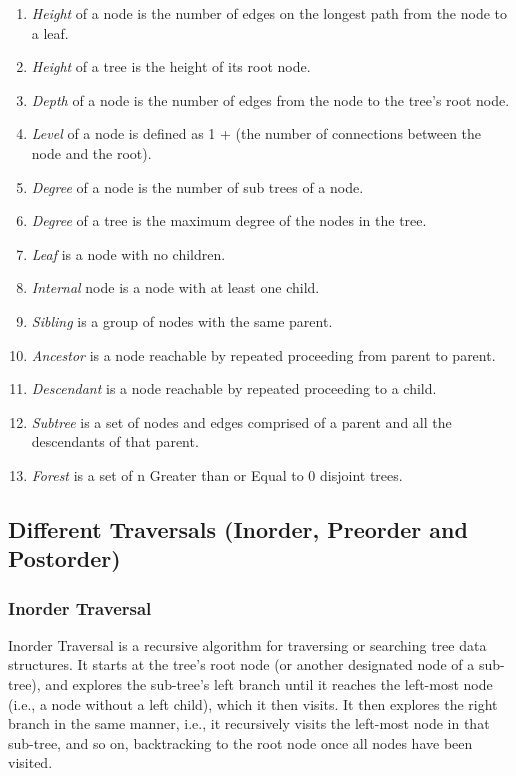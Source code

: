 \documentclass[11pt]{article}
\begin{document}
\begin{enumerate}
    \item \textit{Height} of a node is the number of edges on the longest path from the node to a leaf.
    \item \textit{Height} of a tree is the height of its root node.
    \item \textit{Depth} of a node is the number of edges from the node to the tree's root node.
    \item \textit{Level} of a node is defined as 1 + (the number of connections between the node and the root).
    \item \textit{Degree} of a node is the number of sub trees of a node.
    \item \textit{Degree} of a tree is the maximum degree of the nodes in the tree.
    \item \textit{Leaf} is a node with no children.
    \item \textit{Internal} node is a node with at least one child.
    \item \textit{Sibling} is a group of nodes with the same parent.
    \item \textit{Ancestor} is a node reachable by repeated proceeding from parent to parent.
    \item \textit{Descendant} is a node reachable by repeated proceeding to a child.
    \item \textit{Subtree} is a set of nodes and edges comprised of a parent and all the descendants of that parent.
    \item \textit{Forest} is a set of n Greater than or Equal to 0 disjoint trees.
\end{enumerate}

\subsection{Different Traversals (Inorder, Preorder and Postorder)}

\subsubsection{Inorder Traversal}
Inorder Traversal is a recursive algorithm for traversing or searching tree data structures. It starts at the tree's root node (or another designated node of a sub-tree), and explores the sub-tree's left branch until it reaches the left-most node (i.e., a node without a left child), which it then visits. It then explores the right branch in the same manner, i.e., it recursively visits the left-most node in that sub-tree, and so on, backtracking to the root node once all nodes have been visited.
\end{document}
